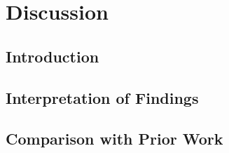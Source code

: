 
\chapter{Discussion}

\section{Introduction}



\section{Interpretation of Findings}





\section{Comparison with Prior Work}

